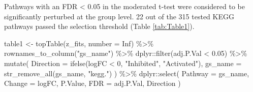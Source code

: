 \documentclass[9pt,a4paper,]{extarticle}
\newenvironment{Shaded}{\begin{snugshade}}{\end{snugshade}}
\newcommand{\AttributeTok}[1]{\textcolor[rgb]{0.77,0.63,0.00}{#1}}
\newcommand{\ConstantTok}[1]{\textcolor[rgb]{0.00,0.00,0.00}{#1}}
\newcommand{\DecValTok}[1]{\textcolor[rgb]{0.00,0.00,0.81}{#1}}
\newcommand{\FloatTok}[1]{\textcolor[rgb]{0.00,0.00,0.81}{#1}}
\newcommand{\FunctionTok}[1]{\textcolor[rgb]{0.00,0.00,0.00}{#1}}
\newcommand{\NormalTok}[1]{#1}
\newcommand{\OtherTok}[1]{\textcolor[rgb]{0.56,0.35,0.01}{#1}}
\newcommand{\SpecialCharTok}[1]{\textcolor[rgb]{0.00,0.00,0.00}{#1}}
\newcommand{\StringTok}[1]{\textcolor[rgb]{0.31,0.60,0.02}{#1}}
\begin{document}
Pathways with an FDR \textless{} 0.05 in the moderated t-test were considered to be significantly perturbed at the group level. 22 out of the 315 tested KEGG pathways passed the selection threshold (Table \ref{tab:Table1}).

\begin{Shaded}
\begin{Highlighting}[]
\NormalTok{table1 }\OtherTok{\textless{}{-}} \FunctionTok{topTable}\NormalTok{(z\_fits, }\AttributeTok{number =} \ConstantTok{Inf}\NormalTok{) }\SpecialCharTok{\%\textgreater{}\%}
  \FunctionTok{rownames\_to\_column}\NormalTok{(}\StringTok{"gs\_name"}\NormalTok{) }\SpecialCharTok{\%\textgreater{}\%}
\NormalTok{  dplyr}\SpecialCharTok{::}\FunctionTok{filter}\NormalTok{(adj.P.Val }\SpecialCharTok{\textless{}} \FloatTok{0.05}\NormalTok{) }\SpecialCharTok{\%\textgreater{}\%} 
  \FunctionTok{mutate}\NormalTok{(}
    \AttributeTok{Direction =} \FunctionTok{ifelse}\NormalTok{(logFC }\SpecialCharTok{\textless{}} \DecValTok{0}\NormalTok{, }\StringTok{"Inhibited"}\NormalTok{, }\StringTok{"Activated"}\NormalTok{), }
    \AttributeTok{gs\_name =} \FunctionTok{str\_remove\_all}\NormalTok{(gs\_name, }\StringTok{"kegg."}\NormalTok{)}
\NormalTok{  ) }\SpecialCharTok{\%\textgreater{}\%}
\NormalTok{  dplyr}\SpecialCharTok{::}\FunctionTok{select}\NormalTok{(}
    \AttributeTok{Pathway =}\NormalTok{ gs\_name, }\AttributeTok{Change =}\NormalTok{ logFC,  P.Value, }\AttributeTok{FDR =}\NormalTok{ adj.P.Val, Direction}
\NormalTok{  )}
\end{Highlighting}
\end{Shaded}
\end{document}
